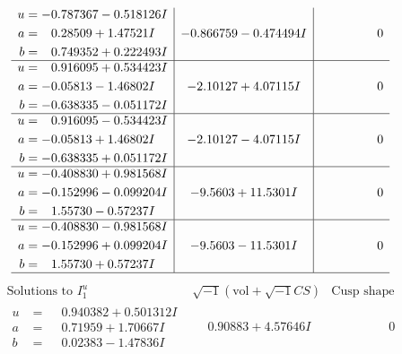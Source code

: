 \documentclass[1p]{elsarticle_modified}
\theoremstyle{definition}
\newcommand{\I}{\sqrt{-1}}
\begin{document}
$$\begin{array}{c|c|c}
\begin{aligned}
u &= -0.787367 - 0.518126 I \\
a &= \phantom{-}0.28509 + 1.47521 I \\
b &= \phantom{-}0.749352 + 0.222493 I\end{aligned}
 & -0.866759 - 0.474494 I & \phantom{-0.000000 } 0 \\ \hline\begin{aligned}
u &= \phantom{-}0.916095 + 0.534423 I \\
a &= -0.05813 - 1.46802 I \\
b &= -0.638335 - 0.051172 I\end{aligned}
 & -2.10127 + 4.07115 I & \phantom{-0.000000 } 0 \\ \hline\begin{aligned}
u &= \phantom{-}0.916095 - 0.534423 I \\
a &= -0.05813 + 1.46802 I \\
b &= -0.638335 + 0.051172 I\end{aligned}
 & -2.10127 - 4.07115 I & \phantom{-0.000000 } 0 \\ \hline\begin{aligned}
u &= -0.408830 + 0.981568 I \\
a &= -0.152996 - 0.099204 I \\
b &= \phantom{-}1.55730 - 0.57237 I\end{aligned}
 & -9.5603 + 11.5301 I & \phantom{-0.000000 } 0 \\ \hline\begin{aligned}
u &= -0.408830 - 0.981568 I \\
a &= -0.152996 + 0.099204 I \\
b &= \phantom{-}1.55730 + 0.57237 I\end{aligned}
 & -9.5603 - 11.5301 I & \phantom{-0.000000 } 0\\
 \hline 
 \end{array}$$\newpage$$\begin{array}{c|c|c}  
\text{Solutions to }I^u_{1}& \I (\text{vol} + \sqrt{-1}CS) & \text{Cusp shape}\\
 \hline 
\begin{aligned}
u &= \phantom{-}0.940382 + 0.501312 I \\
a &= \phantom{-}0.71959 + 1.70667 I \\
b &= \phantom{-}0.02383 - 1.47836 I\end{aligned}
 & \phantom{-}0.90883 + 4.57646 I & \phantom{-0.000000 } 0 \\ \hline\begin{aligned}

\end{aligned}
\end{array}$$
\end{document}
